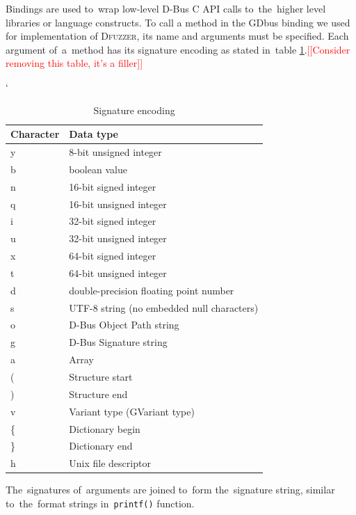 \documentclass[conference]{IEEEtran}
\newcommand{\addtodo}[1]{\textcolor{red}{[[#1]]}}
\begin{document}
Bindings are used to~wrap low-level D-Bus C API calls to~the~higher level
libraries or language constructs. To call a method in the GDbus binding we used
for implementation of \textsc{Dfuzzer}, its name and arguments must be specified. Each
argument of~a~method has its signature encoding as stated in~table
\ref{tab:tab1}.\addtodo{Consider removing this table, it's a filler}

\FloatBarrier
\begin{table}[!h]
\catcode`
\caption{Signature encoding}
\label{tab:tab1}
\begin{center}
	\begin{tabular}{| l | l |}
	\hline
	\textbf{Character} & \textbf{Data type} \\ \hline
	y & 8-bit unsigned integer \\ \hline
	b & boolean value \\ \hline
	n & 16-bit signed integer \\ \hline
	q & 16-bit unsigned integer \\ \hline
	i & 32-bit signed integer \\ \hline
	u & 32-bit unsigned integer \\ \hline
	x & 64-bit signed integer \\ \hline
	t & 64-bit unsigned integer \\ \hline
	d & double-precision floating point number \\ \hline
	s & UTF-8 string (no embedded null characters) \\ \hline
	o & D-Bus Object Path string \\ \hline
	g & D-Bus Signature string \\ \hline
	a & Array \\ \hline
	( & Structure start \\ \hline
	) & Structure end \\ \hline
	v & Variant type (GVariant type) \\ \hline
	\{ & Dictionary begin \\ \hline
	\} & Dictionary end \\ \hline
	h & Unix file descriptor \\
	\hline
	\end{tabular}
\end{center}
\end{table}
\FloatBarrier

The~signatures of~arguments are joined to~form the~signature
string, similar to~the~format strings
in~\texttt{printf()} function.
\end{document}
